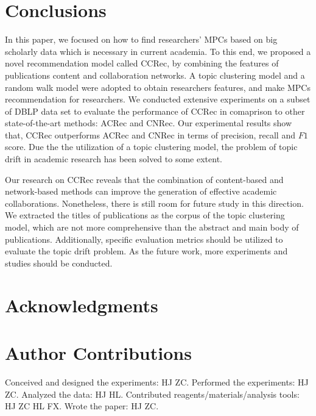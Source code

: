 \documentclass[10pt]{article}
\begin{document}
\section*{Conclusions}
In this paper, we focused on how to find researchers' MPCs based on big scholarly data which is necessary in current academia. To this end, we proposed a novel recommendation model called CCRec, by combining the features of publications content and collaboration networks. A topic clustering model and a random walk model were adopted to obtain researchers features, and make MPCs recommendation for researchers. We conducted extensive experiments on a subset of DBLP data set to evaluate the performance of CCRec in comaprison to other state-of-the-art methods: ACRec and CNRec. Our experimental results show that, CCRec outperforms ACRec and CNRec in terms of precision, recall and $F1$ score. Due the the utilization of a topic clustering model, the problem of topic drift in academic research has been solved to some extent.

Our research on CCRec reveals that the combination of content-based and network-based methods can improve the generation of effective academic collaborations. Nonetheless, there is still room for future study in this direction. We extracted the titles of publications as the corpus of the topic clustering model, which are not more comprehensive than the abstract and main body of publications. Additionally, specific evaluation metrics should be utilized to evaluate the topic drift problem. As the future work, more experiments and studies should be conducted.

\section*{Acknowledgments}

\section*{Author Contributions}
Conceived and designed the experiments: HJ ZC. Performed the experiments: HJ ZC. Analyzed the data: HJ HL. Contributed reagents/materials/analysis tools: HJ ZC HL FX. Wrote the paper: HJ ZC.
\end{document}

